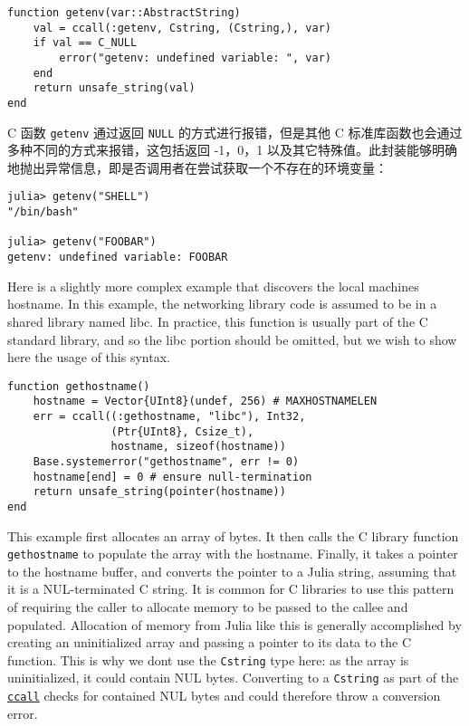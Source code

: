 \begin{verbatim}
function getenv(var::AbstractString)
    val = ccall(:getenv, Cstring, (Cstring,), var)
    if val == C_NULL
        error("getenv: undefined variable: ", var)
    end
    return unsafe_string(val)
end
\end{verbatim}



C 函数 \texttt{getenv} 通过返回 \texttt{NULL} 的方式进行报错，但是其他 C 标准库函数也会通过多种不同的方式来报错，这包括返回 -1，0，1 以及其它特殊值。此封装能够明确地抛出异常信息，即是否调用者在尝试获取一个不存在的环境变量：




\begin{verbatim}
julia> getenv("SHELL")
"/bin/bash"

julia> getenv("FOOBAR")
getenv: undefined variable: FOOBAR
\end{verbatim}



Here is a slightly more complex example that discovers the local machine{\textquotesingle}s hostname. In this example, the networking library code is assumed to be in a shared library named {\textquotedbl}libc{\textquotedbl}. In practice, this function is usually part of the C standard library, and so the {\textquotedbl}libc{\textquotedbl} portion should be omitted, but we wish to show here the usage of this syntax.




\begin{verbatim}
function gethostname()
    hostname = Vector{UInt8}(undef, 256) # MAXHOSTNAMELEN
    err = ccall((:gethostname, "libc"), Int32,
                (Ptr{UInt8}, Csize_t),
                hostname, sizeof(hostname))
    Base.systemerror("gethostname", err != 0)
    hostname[end] = 0 # ensure null-termination
    return unsafe_string(pointer(hostname))
end
\end{verbatim}



This example first allocates an array of bytes. It then calls the C library function \texttt{gethostname} to populate the array with the hostname. Finally, it takes a pointer to the hostname buffer, and converts the pointer to a Julia string, assuming that it is a NUL-terminated C string. It is common for C libraries to use this pattern of requiring the caller to allocate memory to be passed to the callee and populated. Allocation of memory from Julia like this is generally accomplished by creating an uninitialized array and passing a pointer to its data to the C function. This is why we don{\textquotesingle}t use the \texttt{Cstring} type here: as the array is uninitialized, it could contain NUL bytes. Converting to a \texttt{Cstring} as part of the \hyperlink{14245046751182637566}{\texttt{ccall}} checks for contained NUL bytes and could therefore throw a conversion error.



